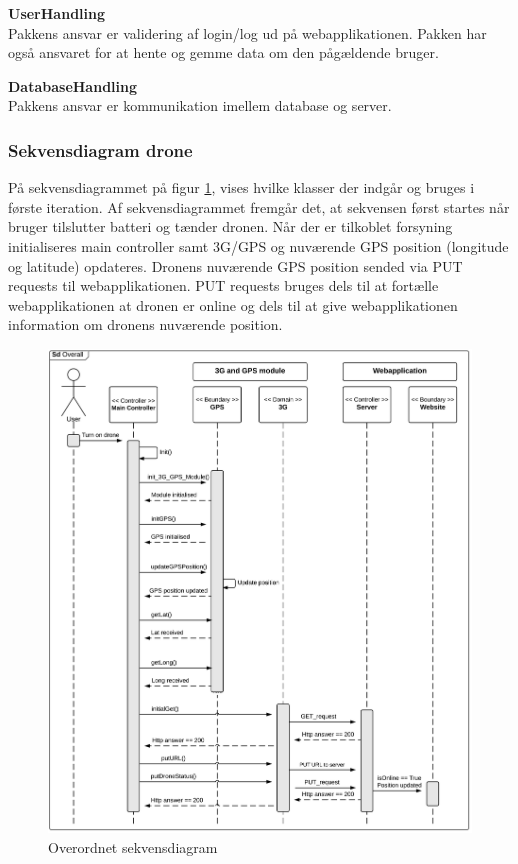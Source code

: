 \textbf{UserHandling}\\
Pakkens ansvar er validering af login/log ud på webapplikationen. Pakken har også ansvaret for at hente og gemme data om den pågældende bruger.

\textbf{DatabaseHandling}\\
Pakkens ansvar er kommunikation imellem database og server. 


\newpage
\subsubsection*{Sekvensdiagram drone}
På sekvensdiagrammet på figur \ref{fig:Sekvens_diagram_iteration1}, vises hvilke klasser der indgår og bruges i første iteration. Af sekvensdiagrammet fremgår det, at sekvensen først startes når bruger tilslutter batteri og tænder dronen. Når der er tilkoblet forsyning initialiseres main controller samt 3G/GPS og nuværende GPS position  (longitude og latitude) opdateres. Dronens nuværende GPS position sended via PUT requests til webapplikationen. PUT requests bruges dels til at fortælle webapplikationen at dronen er online og dels til at give webapplikationen information om dronens nuværende position. 

\begin{figure}[H]
	\centering
	\includegraphics[width=1\textwidth]{Billeder/sekvens/sekvens_iteration1}
	\caption{Overordnet sekvensdiagram}
	\label{fig:Sekvens_diagram_iteration1}
\end{figure}
\newpage

